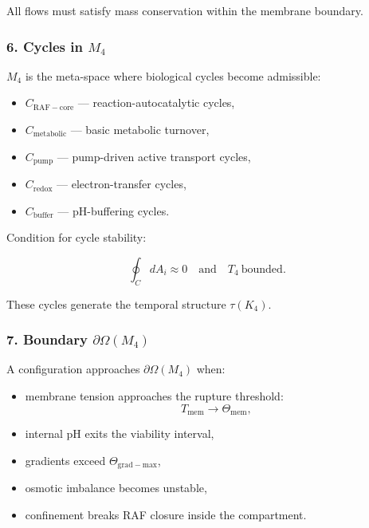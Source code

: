 All flows must satisfy mass conservation within the membrane boundary.

\subsubsection*{6. Cycles in \texorpdfstring{$M_4$}{M_4}}

$M_4$ is the meta-space where biological cycles become admissible:

\begin{itemize}
    \item $C_{\mathrm{RAF-core}}$ — reaction-autocatalytic cycles,
    \item $C_{\mathrm{metabolic}}$ — basic metabolic turnover,
    \item $C_{\mathrm{pump}}$ — pump-driven active transport cycles,
    \item $C_{\mathrm{redox}}$ — electron-transfer cycles,
    \item $C_{\mathrm{buffer}}$ — pH-buffering cycles.
\end{itemize}

Condition for cycle stability:

\[
\oint_C dA_i \approx 0
\quad\text{and}\quad
T_4 \ \text{bounded}.
\]

These cycles generate the temporal structure $\tau(K_4)$.

\subsubsection*{7. Boundary \texorpdfstring{$\partial\Omega(M_4)$}{\partial\Omega(M_4)}}

A configuration approaches $\partial\Omega(M_4)$ when:

\begin{itemize}
    \item membrane tension approaches the rupture threshold:
    \[
    T_{\mathrm{mem}} \to \Theta_{\mathrm{mem}},
    \]
    \item internal pH exits the viability interval,
    \item gradients exceed $\Theta_{\mathrm{grad-max}}$,
    \item osmotic imbalance becomes unstable,
    \item confinement breaks RAF closure inside the compartment.
\end{itemize}

